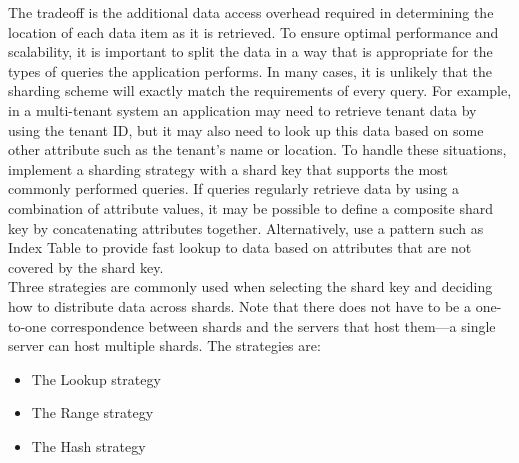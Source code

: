 \documentclass[10pt, conference]{IEEEtran}
\begin{document}
\indent The tradeoff is the additional data access overhead required in determining the location of each data item as it is retrieved. To ensure optimal performance and scalability, it is important to split the data in a way that is appropriate for the types of queries the application performs. In many cases, it is unlikely that the sharding scheme will exactly match the requirements of every query. For example, in a multi-tenant system an application may need to retrieve tenant data by using the tenant ID, but it may also need to look up this data based on some other attribute such as the tenant’s name or location. To handle these situations, implement a sharding strategy with a shard key that supports the most commonly performed queries. If queries regularly retrieve data by using a combination of attribute values, it may be possible to define a composite shard key by concatenating attributes together. Alternatively, use a pattern such as Index Table to provide fast lookup to data based on attributes that are not covered by the shard key.\\
\indent Three strategies are commonly used when selecting the shard key and deciding how to distribute data across shards. Note that there does not have to be a one-to-one correspondence between shards and the servers that host them—a single server can host multiple shards. The strategies are:
\begin{itemize}
\item The Lookup strategy
\item The Range strategy
\item The Hash strategy
\end{itemize}
\end{document}
